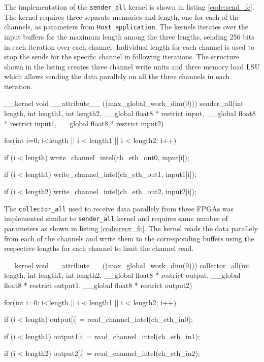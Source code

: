 The implementation of the \texttt{sender\_all} kernel is shown in listing \ref{code:send_fc}.
The kernel requires three separate memories and length, one for each of the channels, as
parameters from \texttt{Host application}. The kernels iterates over the input buffers for the maximum length
among the three lengths, sending 256 bits in each iteration over each channel. Individual
length for each channel is used to stop the sends for the specific channel in following
iterations. The structure shown in the listing creates three channel write units and three
memory load \ac{LSU} which allows sending the data parallely on all the three channels
in each iteration.

\begin{CppCode} [caption=Sender Kernel for \texttt{fully connected}, frame=tlrb, label=code:send_fc]
__kernel void __attribute__ ((max_global_work_dim(0)))
sender_all(int length, int length1, int length2,
            __global float8 * restrict input,
            __global float8 * restrict input1,
            __global float8 * restrict input2)
{
    for(int i=0; i<length || i < length1 || i < length2; i++)
    {
        if (i < length)
            write_channel_intel(ch_eth_out0, input[i]);

        if (i < length1)
            write_channel_intel(ch_eth_out1, input1[i]);

        if (i < length2)
            write_channel_intel(ch_eth_out2, input2[i]);
    }
}
\end{CppCode}

The \texttt{collector\_all} used to receive data parallely from three FPGAs
was implemented similar to \texttt{sender\_all} kernel and requires same
number of parameters as shown in listing \ref{code:recv_fc}. The kernel
reads the data parallely from each of the channels and write them to the
corresponding buffers using the respective lengths for each channel
to limit the channel read.

\begin{CppCode} [caption=Collector Kernel for \texttt{fully connected}, frame=tlrb, label=code:recv_fc]
__kernel void __attribute__ ((max_global_work_dim(0)))
collector_all(int length, int length1, int length2,
            __global float8 * restrict output,
            __global float8 * restrict output1,
            __global float8 * restrict output2)
{
    for(int i=0; i<length || i < length1 || i < length2; i++)
    {
        if (i < length)
            output[i] = read_channel_intel(ch_eth_in0);

        if (i < length1)
            output1[i] = read_channel_intel(ch_eth_in1);

        if (i < length2)
            output2[i] = read_channel_intel(ch_eth_in2);
    }
}
\end{CppCode}

